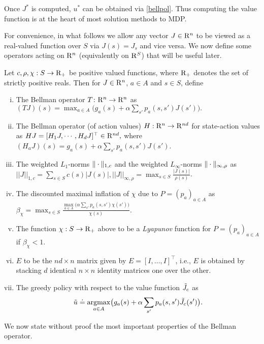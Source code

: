 Once $J^*$ is computed, $u^*$ can be obtained via \eqref{bellpol}. Thus computing the value function is at the heart of most solution methods to MDP.\par
For convenience, in what follows we allow any vector $J\in \mathrm{R}^n$ to be viewed as a real-valued function over $S$ via $J(s) = J_s$ and vice versa.
We now define some operators acting on $\mathrm{R}^n$ (equivalently on $\mathrm{R}^S$) that will be useful later.
\begin{definition}
Let $c,\rho,\chi:S \to \mathrm{R}_+$ be positive valued functions, where $\mathrm{R}_+$ denotes the set of strictly positive reals. Then for $J\in \mathrm{R}^n$, $a\in A$ and $s\in S$, 
define
\begin{enumerate}[(i)]
\item The Bellman operator $T\colon \mathrm{R}^n \rightarrow \mathrm{R}^n$ as $(TJ)(s)=\max_{a \in A}\big(g_a(s)+\alpha \sum_{s'} p_a(s,s')J(s')\big).
$
\item \label{bellactval} The Bellman operator (of action values) $H: \mathrm{R}^n \to \mathrm{R}^{nd}$ for state-action values as $HJ=[ H_1 J,\cdots,H_d J]^\top\in \mathrm{R}^{nd},$ where $(H_a J)(s)= g_a(s)+\alpha \sum_{s'}p_a(s,s') J(s')$.
\item The weighted $L_1$-norms $\|\cdot\|_{1,c}$ 
and 
the weighted $L_\infty$-norms  $\|\cdot\|_{\infty,\rho}$ as $
||J||_{1,c}=\sum_{s \in S} c(s)|J(s)|, 
||J||_{\infty,\rho}=\max_{s \in S} \frac{|J(s)|}{\rho(s)}$.
\item The discounted maximal inflation of $\chi$ due to $P = (p_a)_{a\in A}$ as $\beta_{\chi}=\max_{s \in S} \frac{\underset{a \in A}{\max}\big(\alpha\sum_{s'}p_a(s,s')\chi(s')\big)}{\chi(s)}$.
\item The function $\chi:S\to\mathrm{R}_+$ above to be a \emph{Lyapunov} function for $P = (p_a)_{a\in A}$ if $\beta_{\chi}<1$.
\item $E$ to be the $nd\times n$ matrix given by $E=[I,\ldots,I]^\top$, i.e., $E$ is obtained by stacking $d$ identical $n\times n$ identity matrices one over the other.
\item The greedy policy with respect to the value function $\tilde{J}_c$ as \begin{align*}\tilde{u}\doteq\underset{a\in A}{\operatorname{argmax}}\big(g_a(s)+\alpha \sum_{s'}p_a(s,s')\tilde{J}_c(s')\big).\end{align*}
\end{enumerate}
\end{definition}
We now state without proof the most important properties of the Bellman operator.
